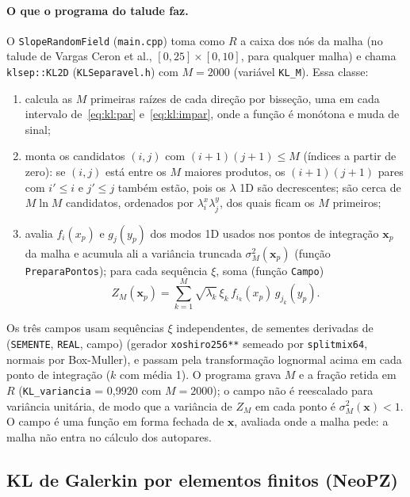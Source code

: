 \paragraph{O que o programa do talude faz.}
O \texttt{SlopeRandomField} (\texttt{main.cpp}) toma como $R$ a caixa dos nós da malha (no talude de Vargas Ceron et al.,
$[0, 25] \times [0, 10]$, para qualquer malha) e chama \texttt{klsep::KL2D} (\texttt{KLSeparavel.h}) com
$M = 2000$ (variável \texttt{KL\_M}). Essa classe:
\begin{enumerate}
  \item calcula as $M$ primeiras raízes de cada direção por bisseção, uma em cada intervalo de~\eqref{eq:kl:par}
    e~\eqref{eq:kl:impar}, onde a função é monótona e muda de sinal;
  \item monta os candidatos $(i, j)$ com $(i + 1)(j + 1) \le M$ (índices a partir de zero): se $(i, j)$ está entre os $M$
    maiores produtos, os $(i + 1)(j + 1)$ pares com $i' \le i$ e $j' \le j$ também estão, pois os $\lambda$ 1D são
    decrescentes; são cerca de $M \ln M$ candidatos, ordenados por $\lambda_i^x \lambda_j^y$, dos quais ficam os $M$
    primeiros;
  \item avalia $f_i(x_p)$ e $g_j(y_p)$ dos modos 1D usados nos pontos de integração $\mathbf{x}_p$ da malha e
    acumula ali a variância truncada $\sigma_M^2(\mathbf{x}_p)$ (função \texttt{PreparaPontos}); para cada
    sequência $\xi$, soma (função \texttt{Campo})
    \begin{equation*}
      Z_M(\mathbf{x}_p) = \sum_{k = 1}^{M} \sqrt{\lambda_k} \, \xi_k \, f_{i_k}(x_p) \, g_{j_k}(y_p).
    \end{equation*}
\end{enumerate}
Os três campos usam sequências $\xi$ independentes, de sementes derivadas de (\texttt{SEMENTE}, \texttt{REAL}, campo)
(gerador \texttt{xoshiro256**} semeado por \texttt{splitmix64}, normais por Box-Muller), e passam pela transformação
lognormal acima em cada ponto de integração ($k$ com média 1). O programa grava $M$ e a fração retida em $R$
(\texttt{KL\_variancia} = 0,9920 com $M = 2000$); o campo não é reescalado para variância unitária, de modo que a
variância de $Z_M$ em cada ponto é $\sigma_M^2(\mathbf{x}) < 1$. O campo é uma função em forma fechada de $\mathbf{x}$,
avaliada onde a malha pede: a malha não entra no cálculo dos autopares.

\subsection{KL de Galerkin por elementos finitos (NeoPZ)}\label{kl:form:galerkin}

